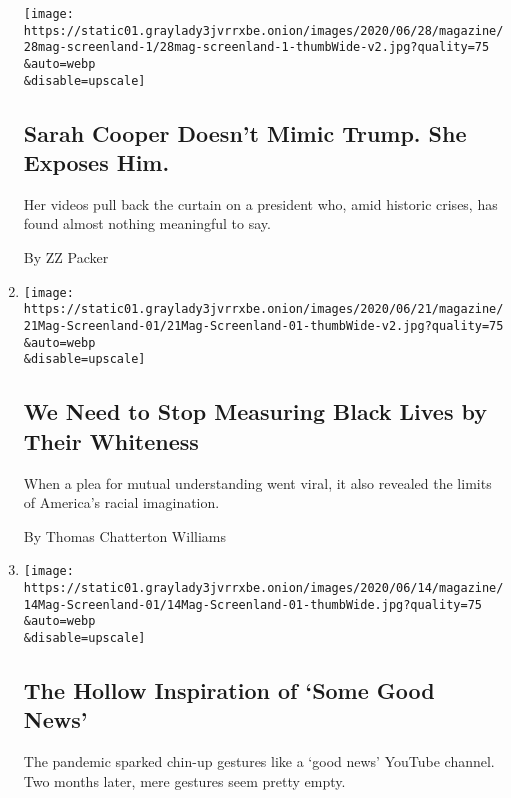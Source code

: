 \begin{enumerate}
  \texttt{[image: https://static01.graylady3jvrrxbe.onion/images/2020/06/28/magazine/28mag-screenland-1/28mag-screenland-1-thumbWide-v2.jpg?quality=75\\\&auto=webp\\\&disable=upscale]}

  \hypertarget{sarah-cooper-doesnt-mimic-trump-she-exposes-him}{%
  \subsection{Sarah Cooper Doesn't Mimic Trump. She Exposes
  Him.}\label{sarah-cooper-doesnt-mimic-trump-she-exposes-him}}

  Her videos pull back the curtain on a president who, amid historic
  crises, has found almost nothing meaningful to say.

  By ZZ Packer
\item
  \href{/2020/06/18/magazine/before-you-call-the-cops-video-tyler-merritt.html}{}

  \texttt{[image: https://static01.graylady3jvrrxbe.onion/images/2020/06/21/magazine/21Mag-Screenland-01/21Mag-Screenland-01-thumbWide-v2.jpg?quality=75\\\&auto=webp\\\&disable=upscale]}

  \hypertarget{we-need-to-stop-measuring-black-lives-by-their-whiteness}{%
  \subsection{We Need to Stop Measuring Black Lives by Their
  Whiteness}\label{we-need-to-stop-measuring-black-lives-by-their-whiteness}}

  When a plea for mutual understanding went viral, it also revealed the
  limits of America's racial imagination.

  By Thomas Chatterton Williams
\item
  \href{/2020/06/11/magazine/the-hollow-inspiration-of-some-good-news.html}{}

  \texttt{[image: https://static01.graylady3jvrrxbe.onion/images/2020/06/14/magazine/14Mag-Screenland-01/14Mag-Screenland-01-thumbWide.jpg?quality=75\\\&auto=webp\\\&disable=upscale]}

  \hypertarget{the-hollow-inspiration-of-some-good-news}{%
  \subsection{The Hollow Inspiration of `Some Good
  News'}\label{the-hollow-inspiration-of-some-good-news}}

  The pandemic sparked chin-up gestures like a `good news' YouTube
  channel. Two months later, mere gestures seem pretty empty.


\end{enumerate}
